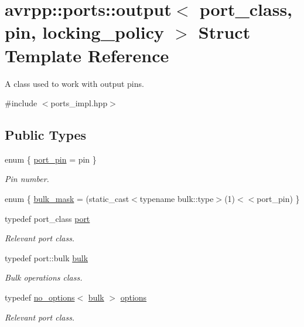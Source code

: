 \hypertarget{structavrpp_1_1ports_1_1output}{
\section{avrpp::ports::output$<$ port\_\-class, pin, locking\_\-policy $>$ Struct Template Reference}
\label{structavrpp_1_1ports_1_1output}
}


A class used to work with output pins.  




{\ttfamily \#include $<$ports\_\-impl.hpp$>$}

\subsection*{Public Types}
\begin{DoxyCompactItemize}
\item 
enum \{ \hyperlink{structavrpp_1_1ports_1_1output_a4af0fffcb7e47b6b2824e89588d6d97da81563aa2dc6432e0198561d47ca3aa90}{port\_\-pin} = pin
 \}
\begin{DoxyCompactList}\small\item\em Pin number. \item\end{DoxyCompactList}\item 
enum \{ \hyperlink{structavrpp_1_1ports_1_1output_a9ce0e6e31fbb19b66f32d187d3449897a91b03d6c0e61d15c8262f6e4ef097763}{bulk\_\-mask} = (static\_\-cast$<$typename bulk::type$>$(1)$<$$<$port\_\-pin)
 \}
\item 
typedef port\_\-class \hyperlink{structavrpp_1_1ports_1_1output_a978653db3f21470235358773a0209ad3}{port}
\begin{DoxyCompactList}\small\item\em Relevant port class. \item\end{DoxyCompactList}\item 
typedef port::bulk \hyperlink{structavrpp_1_1ports_1_1output_a74c28e62f6e4fd2dc9f5c620dc66cd86}{bulk}
\begin{DoxyCompactList}\small\item\em Bulk operations class. \item\end{DoxyCompactList}\item 
typedef \hyperlink{structavrpp_1_1ports_1_1no__options}{no\_\-options}$<$ \hyperlink{structavrpp_1_1ports_1_1output_a74c28e62f6e4fd2dc9f5c620dc66cd86}{bulk} $>$ \hyperlink{structavrpp_1_1ports_1_1output_af4681048d0ad934f06870c374fbb5402}{options}
\begin{DoxyCompactList}\small\item\em Relevant port class. \item\end{DoxyCompactList}\end{DoxyCompactItemize}
